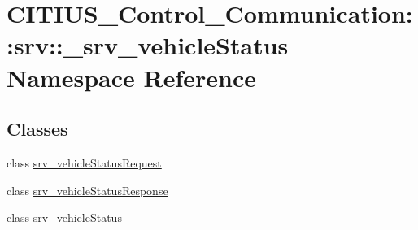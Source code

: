 \hypertarget{namespace_c_i_t_i_u_s___control___communication_1_1srv_1_1__srv__vehicle_status}{\section{\-C\-I\-T\-I\-U\-S\-\_\-\-Control\-\_\-\-Communication\-:\-:srv\-:\-:\-\_\-srv\-\_\-vehicle\-Status \-Namespace \-Reference}
\label{namespace_c_i_t_i_u_s___control___communication_1_1srv_1_1__srv__vehicle_status}
}
\subsection*{\-Classes}
\begin{DoxyCompactItemize}
\item 
class \hyperlink{class_c_i_t_i_u_s___control___communication_1_1srv_1_1__srv__vehicle_status_1_1srv__vehicle_status_request}{srv\-\_\-vehicle\-Status\-Request}
\item 
class \hyperlink{class_c_i_t_i_u_s___control___communication_1_1srv_1_1__srv__vehicle_status_1_1srv__vehicle_status_response}{srv\-\_\-vehicle\-Status\-Response}
\item 
class \hyperlink{class_c_i_t_i_u_s___control___communication_1_1srv_1_1__srv__vehicle_status_1_1srv__vehicle_status}{srv\-\_\-vehicle\-Status}
\end{DoxyCompactItemize}

